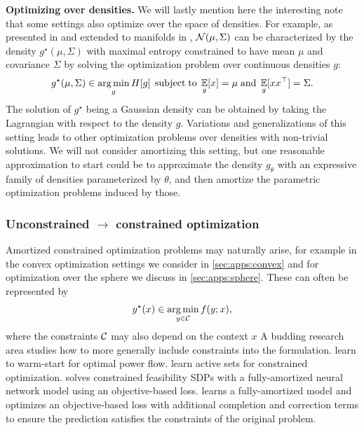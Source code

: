 \documentclass[twoside,11pt]{article}
\begin{document}
\textbf{Optimizing over densities.}
We will lastly mention here the interesting note that
some settings also optimize over the space of densities.
For example, as presented in \citet[p.~47]{guiasu1985principle}
and extended to manifolds in \citet[\S6.2]{pennec2006intrinsic},
${\mathcal{N}}(\mu, \Sigma)$ can be characterized
by the density $g^\star(\mu, \Sigma)$ with maximal entropy
constrained to have mean $\mu$ and covariance $\Sigma$ by solving
the optimization problem over continuous densities $g$:
\begin{equation}
  g^\star(\mu, \Sigma)\in \operatorname*{arg\,min}_g H[g]\; \operatorname*{subject\;to}\; \operatorname*{\mathbb{E}}_g[x] = \mu\; {\rm and}\; \operatorname*{\mathbb{E}}_g[xx^\top] = \Sigma.
  \label{eq:maxent}
\end{equation}
The solution of $g^\star$ being a Gaussian density can be
obtained by taking the Lagrangian with respect to the density $g$.
Variations and generalizations of this setting leads to
other optimization problems over densities with non-trivial solutions.
We will not consider amortizing this setting,
but one reasonable approximation to start could
be to approximate the density $g_\theta$ with an expressive
family of densities parameterized by $\theta$, and then
amortize the parametric optimization problems induced by those.

\subsubsection{Unconstrained $\rightarrow$ constrained optimization}
\label{sec:constraints}
Amortized constrained optimization problems may naturally arise, for example
in the convex optimization settings we consider in \cref{sec:apps:convex}
and for optimization over the sphere we discuss in \cref{sec:apps:sphere}.
These can often be represented by
\begin{equation}
  y^\star(x) \in \operatorname*{arg\,min}_{y\in{\mathcal{C}}} f(y; x),
  \label{eq:opt-constrained}
\end{equation}
where the constraints ${\mathcal{C}}$ may also depend on the context $x$
A budding research area studies how to more generally include
constraints into the formulation.
\citet{baker2019learning,dong2020smart,zamzam2020learning,pan2020deepopf}
learn to warm-start for optimal power flow.
\citet{misra2021learning} learn active sets for constrained optimization.
\citet{krivachy2020fast} solves constrained feasibility SDPs
with a fully-amortized neural network model using an
objective-based loss.
\citet{donti2021dc3} learns a fully-amortized model and optimizes an
objective-based loss with additional completion and correction terms
to ensure the prediction satisfies the constraints of the original problem.
\end{document}
